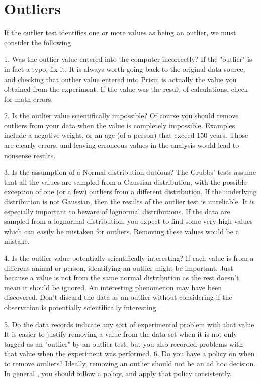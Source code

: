 \documentclass[MdouleBmain.tex]{subfiles}
\begin{document}
\section{Outliers}
If the outlier test identifies one or more values as being an outlier, we must consider the following

1.	Was the outlier value entered into the computer incorrectly?
If the "outlier" is in fact a typo, fix it. It is always worth going back to the original data source, and checking that outlier value entered into Prism is actually the value you obtained from the experiment. If the value was the result of calculations, check for math errors.

2.	Is the outlier value scientifically impossible?
Of course you should remove outliers from your data when the value is completely impossible. Examples include a negative weight, or an age (of a person) that exceed 150 years. Those are clearly errors, and leaving erroneous values in the analysis would lead to nonsense results.

3.	Is the assumption of a Normal distribution dubious?
The Grubbs' tests assume that all the values are sampled from a Gaussian distribution, with the possible exception of one (or a few) outliers from a different distribution. If the underlying distribution is not Gaussian, then the results of the outlier test is unreliable. It is especially important to beware of lognormal distributions. If the data are sampled from a lognormal distribution, you expect to find some very high values which can easily be mistaken for outliers. Removing these values would be a mistake.

4.	Is the outlier value potentially scientifically interesting?
If each value is from a different animal or person, identifying an outlier might be important. Just because a value is not from the same normal distribution as the rest doesn't mean it should be ignored. An interesting phenomenon may have been discovered. Don't discard  the data as an outlier without considering if the observation is potentially scientifically interesting. 

5.	 Do the data records indicate any sort of experimental problem with that value
It is easier to justify removing a value from the data set when it is not only tagged as an "outlier" by an outlier test, but you also recorded problems with that value when the experiment was performed.
6.	 Do you have a policy on when to remove outliers?
Ideally, removing an outlier should not be an ad hoc decision. In general , you should follow a policy, and apply that policy consistently.
\end{document}

